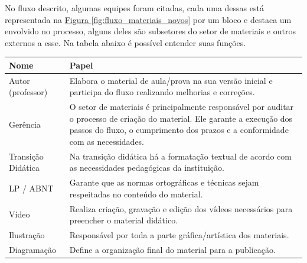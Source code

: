 No fluxo descrito, algumas equipes foram citadas, cada uma dessas está representada na \hyperref[fig:fluxo_materiais_novos]{Figura \ref{fig:fluxo_materiais_novos}} por um bloco e destaca um envolvido no processo, alguns deles são subsetores do setor de materiais e outros externos a esse. Na tabela abaixo é possível entender suas funções.

\begin{center}
\begin{tabular}{|p{3cm}|p{11cm}|}
\hline            
\rowcolor[HTML]{EFEFEF}      
\textbf{Nome} & \textbf{Papel} \\ \hline
Autor (professor) & Elabora o material de aula/prova na sua versão inicial e participa do fluxo realizando melhorias e correções.                                                                                               \\ \hline
Gerência           & O setor de materiais é principalmente responsável por auditar o processo de criação do material. Ele garante a execução dos passos do fluxo, o cumprimento dos prazos e a conformidade com as necessidades. \\ \hline
Transição Didática & Na transição didática há a formatação textual de acordo com as necessidades pedagógicas da instituição.                                                                                                     \\ \hline
LP / ABNT          & Garante que as normas ortográficas e técnicas sejam respeitadas no conteúdo do material.                                                                                                                    \\ \hline
Vídeo              & Realiza criação, gravação e edição dos vídeos necessários para preencher o material didático.                                                                                                               \\ \hline
Ilustração         & Responsável por toda a parte gráfica/artística dos materiais.                                                                                                                                               \\ \hline
Diagramação        & Define a organização final do material para a publicação.                                                                                                                                                   \\ \hline
\end{tabular}
\end{center}

